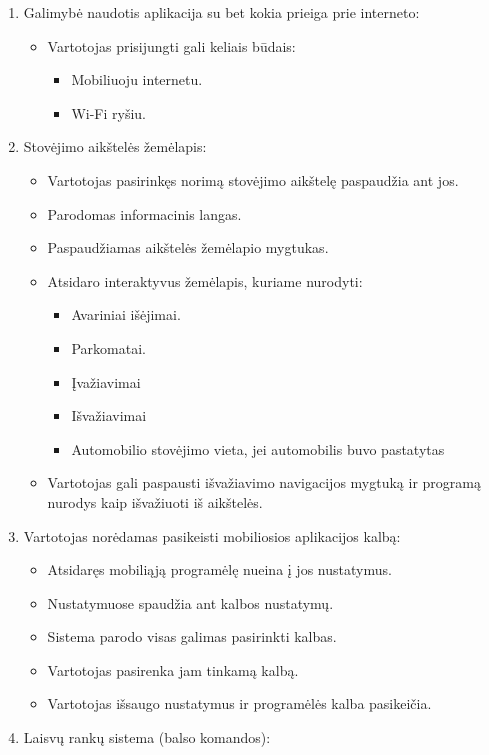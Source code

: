 \documentclass{VUMIFPSkursinis}
\begin{document}
\begin{enumerate}
	\item Galimybė naudotis aplikacija su bet kokia prieiga prie interneto:
		\begin{itemize}
			\item Vartotojas prisijungti gali keliais būdais:
				\begin{itemize}
					\item Mobiliuoju internetu.
					\item Wi-Fi ryšiu.
				\end{itemize}
		\end{itemize}
	\item Stovėjimo aikštelės žemėlapis:
		\begin{itemize}
			\item Vartotojas pasirinkęs norimą stovėjimo aikštelę paspaudžia ant jos.
			\item Parodomas informacinis langas.
			\item Paspaudžiamas aikštelės žemėlapio mygtukas.
			\item Atsidaro interaktyvus žemėlapis, kuriame nurodyti:
				\begin{itemize}
					\item Avariniai išėjimai.
					\item Parkomatai.
					\item Įvažiavimai
					\item Išvažiavimai
					\item Automobilio stovėjimo vieta, jei automobilis buvo pastatytas
				\end{itemize}
			\item Vartotojas gali paspausti išvažiavimo navigacijos mygtuką ir programą nurodys kaip išvažiuoti iš aikštelės.
		\end{itemize}
	\item Vartotojas norėdamas pasikeisti mobiliosios aplikacijos kalbą:
		\begin{itemize}
			\item Atsidaręs mobiliąją programėlę nueina į jos nustatymus.
			\item Nustatymuose spaudžia ant kalbos nustatymų.
			\item Sistema parodo visas galimas pasirinkti kalbas.
			\item Vartotojas pasirenka jam tinkamą kalbą.
			\item Vartotojas išsaugo nustatymus ir programėlės kalba pasikeičia.
		\end{itemize}
	\item Laisvų rankų sistema (balso komandos):

\end{enumerate}
\end{document}
